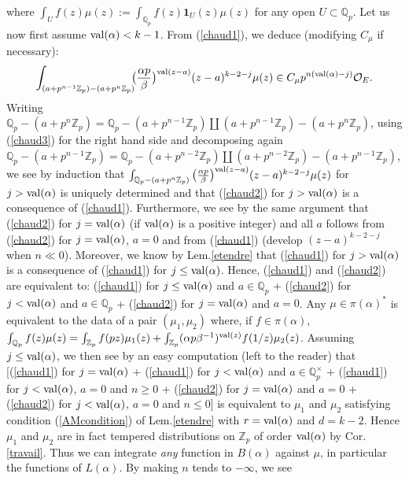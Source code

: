 \documentclass[11pt]{amsart}
\def\Z{{\mathbb Z}_p}
\def\Q{{\mathbb Q}_p}
\def\O{{\mathcal O}_E}
\begin{document}
where $\int_U f(z)\mu(z):=\int_{\Q}f(z){\mathbf 1}_U(z)\mu(z)$ for any
open $U\subset \Q$. Let us now first assume ${\rm
  val}(\alpha)<k-1$. From (\ref{chaud1}), we deduce (modifying
$C_{\mu}$ if necessary):  
\begin{eqnarray}\label{chaud3} 
\int_{(a+p^{n-1}\Z)-(a+p^n\Z)}\!\!\!\big(\frac{\alpha
  p}{\beta}\big)^{{\rm val}(z-a)}(z-a)^{k-2-j}\mu(z)\in
C_{\mu}p^{n({\rm val}(\alpha)-j)}\O.  
\end{eqnarray} 
Writing $\Q-(a+p^n\Z)=\Q-(a+p^{n-1}\Z)\amalg (a+p^{n-1}\Z)-(a+p^n\Z)$,
using (\ref{chaud3}) for the right hand side and decomposing again
$\Q-(a+p^{n-1}\Z)=\Q-(a+p^{n-2}\Z)\amalg (a+p^{n-2}\Z)-(a+p^{n-1}\Z)$,
we see by induction that $\int_{\Q-(a+p^n\Z)}\big(\frac{\alpha
  p}{\beta}\big)^{{\rm val}(z-a)}(z-a)^{k-2-j}\mu(z)$ for $j>{\rm
  val}(\alpha)$ is uniquely determined and that (\ref{chaud2}) for
$j>{\rm val}(\alpha)$ is a consequence of (\ref{chaud1}). Furthermore,
we see by the same argument that (\ref{chaud2}) for $j={\rm
  val}(\alpha)$ (if ${\rm val}(\alpha)$ is a positive integer) and all
$a$ follows from (\ref{chaud2}) for $j={\rm val}(\alpha)$, $a=0$ and
from (\ref{chaud1}) (develop $(z-a)^{k-2-j}$ when $n\ll
0$). Moreover, we know by Lem.\ref{etendre} that (\ref{chaud1}) for
$j>{\rm val}(\alpha)$ is a consequence of (\ref{chaud1}) for $j\leq
{\rm val}(\alpha)$. Hence, (\ref{chaud1}) and (\ref{chaud2}) are
equivalent to: (\ref{chaud1}) for $j\leq {\rm val}(\alpha)$ and $a\in
\Q$ + (\ref{chaud2}) for $j<{\rm val}(\alpha)$ and $a\in \Q$ +
(\ref{chaud2}) for $j={\rm val}(\alpha)$ and $a=0$. Any $\mu\in
\pi(\alpha)^*$ is equivalent to the data of a pair $(\mu_1,\mu_2)$
where, if $f\in \pi(\alpha)$,
$\int_{\Q}f(z)\mu(z)=\int_{\Z}f(pz)\mu_1(z)+\int_{\Z}(\alpha
p\beta^{-1})^{{\rm val}(z)}f(1/z)\mu_2(z)$. Assuming $j\leq {\rm
  val}(\alpha)$, we then see by an easy computation (left to the
reader) that [(\ref{chaud1}) for $j={\rm val}(\alpha)$ +
  (\ref{chaud1}) for $j<{\rm val}(\alpha)$ and $a\in \Q^{\times}$ +
  (\ref{chaud1}) for $j<{\rm val}(\alpha)$, $a=0$ and $n\geq 0$ +
  (\ref{chaud2}) for $j={\rm val}(\alpha)$ and $a=0$ + (\ref{chaud2})
  for $j<{\rm val}(\alpha)$, $a=0$ and $n\leq 0$] is equivalent to
$\mu_1$ and $\mu_2$ satisfying condition (\ref{AMcondition}) of
Lem.\ref{etendre} with $r={\rm val}(\alpha)$ and $d=k-2$. Hence
$\mu_1$ and $\mu_2$ are in fact tempered distributions on $\Z$ of
order ${\rm val}(\alpha)$ by Cor.\ref{travail}. Thus we can integrate
{\it any} function in $B(\alpha)$ against $\mu$, in particular the
functions of $L(\alpha)$. By making $n$ tends to $-\infty$, we see
\end{document}
